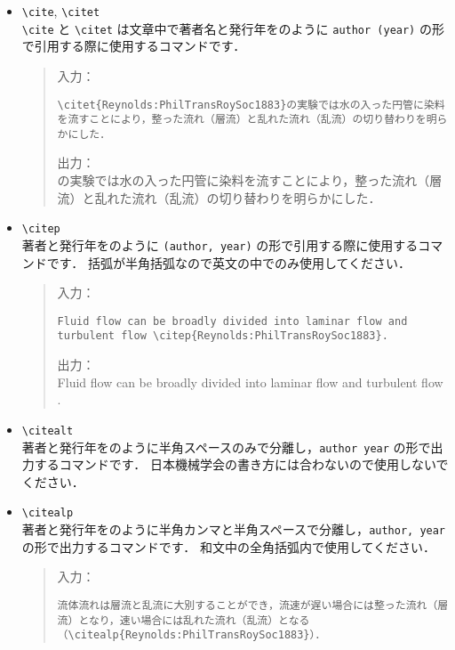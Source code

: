 \begin{itemize}
    \item \verb|\cite|, \verb|\citet| \\
    \verb|\cite| と \verb|\citet| は文章中で著者名と発行年を\citet{Reynolds:PhilTransRoySoc1883}のように \verb|author (year)| の形で引用する際に使用するコマンドです．
\begin{quote}
入力：
\begin{verbatim}
\citet{Reynolds:PhilTransRoySoc1883}の実験では水の入った円管に染料を流すことにより，整った流れ（層流）と乱れた流れ（乱流）の切り替わりを明らかにした．
\end{verbatim}
出力：\\
    \citet{Reynolds:PhilTransRoySoc1883}の実験では水の入った円管に染料を流すことにより，整った流れ（層流）と乱れた流れ（乱流）の切り替わりを明らかにした．
\end{quote}
    \item \verb|\citep| \\
    著者と発行年を\citep{Reynolds:PhilTransRoySoc1883}のように \verb|(author, year)| の形で引用する際に使用するコマンドです．
    括弧が半角括弧なので英文の中でのみ使用してください．
\begin{quote}
入力：
\begin{verbatim}
Fluid flow can be broadly divided into laminar flow and 
turbulent flow \citep{Reynolds:PhilTransRoySoc1883}.
\end{verbatim}
出力：\\
    Fluid flow can be broadly divided into laminar flow and turbulent flow \citep{Reynolds:PhilTransRoySoc1883}.
\end{quote}
    \item \verb|\citealt| \\
    著者と発行年を\citealt{Reynolds:PhilTransRoySoc1883}のように半角スペースのみで分離し，\verb|author year| の形で出力するコマンドです．
    日本機械学会の書き方には合わないので使用しないでください．
    \item \verb|\citealp| \\
    著者と発行年を\citealp{Reynolds:PhilTransRoySoc1883}のように半角カンマと半角スペースで分離し，\verb|author, year| の形で出力するコマンドです．
    和文中の全角括弧内で使用してください．
\begin{quote}
入力：
\begin{verbatim}
流体流れは層流と乱流に大別することができ，流速が遅い場合には整った流れ（層流）となり，速い場合には乱れた流れ（乱流）となる（\citealp{Reynolds:PhilTransRoySoc1883}）．

\end{verbatim}
\end{quote}
\end{itemize}
